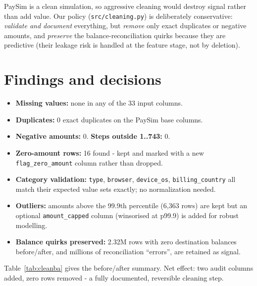 \documentclass[11pt,a4paper]{report}
\newcommand{\code}[1]{\texttt{\small #1}}
\begin{document}
PaySim is a clean simulation, so aggressive cleaning would destroy signal rather than add
value. Our policy (\code{src/cleaning.py}) is deliberately conservative: \emph{validate and
document} everything, but \emph{remove} only exact duplicates or negative amounts, and
\emph{preserve} the balance-reconciliation quirks because they are predictive (their
leakage risk is handled at the feature stage, not by deletion).

\section{Findings and decisions}

\begin{itemize}[nosep,leftmargin=1.4em]
  \item \textbf{Missing values:} none in any of the 33 input columns.
  \item \textbf{Duplicates:} 0 exact duplicates on the PaySim base columns.
  \item \textbf{Negative amounts:} 0. \textbf{Steps outside 1..743:} 0.
  \item \textbf{Zero-amount rows:} 16 found - kept and marked with a new
        \code{flag\_zero\_amount} column rather than dropped.
  \item \textbf{Category validation:} \code{type}, \code{browser}, \code{device\_os},
        \code{billing\_country} all match their expected value sets exactly; no
        normalization needed.
  \item \textbf{Outliers:} amounts above the 99.9th percentile (6{,}363 rows) are kept but
        an optional \code{amount\_capped} column (winsorised at p99.9) is added for robust
        modelling.
  \item \textbf{Balance quirks preserved:} 2.32M rows with zero destination balances
        before/after, and millions of reconciliation ``errors'', are retained as signal.
\end{itemize}

Table~\ref{tab:cleanba} gives the before/after summary. Net effect: two audit columns added,
zero rows removed - a fully documented, reversible cleaning step.
\end{document}
